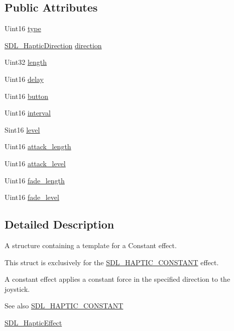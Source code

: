 \subsection*{Public Attributes}
\begin{DoxyCompactItemize}
\item 
Uint16 \hyperlink{structSDL__HapticConstant_a5cb31202803a8bc1be95fcede5ac8afb}{type}
\item 
\hyperlink{structSDL__HapticDirection}{S\+D\+L\+\_\+\+Haptic\+Direction} \hyperlink{structSDL__HapticConstant_a3e871debf4e57c35960f019d2605d84f}{direction}
\item 
Uint32 \hyperlink{structSDL__HapticConstant_aeb994c356b1d236b060f277d157e98ec}{length}
\item 
Uint16 \hyperlink{structSDL__HapticConstant_a16a751009893f5412201e3ce91146b25}{delay}
\item 
Uint16 \hyperlink{structSDL__HapticConstant_aa65321f1b002adaab6e629d5bed556e9}{button}
\item 
Uint16 \hyperlink{structSDL__HapticConstant_ab1f7f0df856f4cf1fdf937cb886226b4}{interval}
\item 
Sint16 \hyperlink{structSDL__HapticConstant_a5b095eea77464623ed57af15f29f4ca6}{level}
\item 
Uint16 \hyperlink{structSDL__HapticConstant_a907bade68ab53fb24e7d2651d19b767f}{attack\+\_\+length}
\item 
Uint16 \hyperlink{structSDL__HapticConstant_a0928a37f3fab0e5b7daffc7a1d65744c}{attack\+\_\+level}
\item 
Uint16 \hyperlink{structSDL__HapticConstant_a647a6b761ac6ba16160d0892a12806bc}{fade\+\_\+length}
\item 
Uint16 \hyperlink{structSDL__HapticConstant_a49f6499c89f3e494efbe92f12277c949}{fade\+\_\+level}
\end{DoxyCompactItemize}


\subsection{Detailed Description}
A structure containing a template for a Constant effect. 

This struct is exclusively for the \hyperlink{SDL__haptic_8h_a955fb9f680dcf9cc72a3d5263e85b80a}{S\+D\+L\+\_\+\+H\+A\+P\+T\+I\+C\+\_\+\+C\+O\+N\+S\+T\+A\+NT} effect.

A constant effect applies a constant force in the specified direction to the joystick.

\begin{DoxySeeAlso}{See also}
\hyperlink{SDL__haptic_8h_a955fb9f680dcf9cc72a3d5263e85b80a}{S\+D\+L\+\_\+\+H\+A\+P\+T\+I\+C\+\_\+\+C\+O\+N\+S\+T\+A\+NT} 

\hyperlink{unionSDL__HapticEffect}{S\+D\+L\+\_\+\+Haptic\+Effect} 
\end{DoxySeeAlso}


